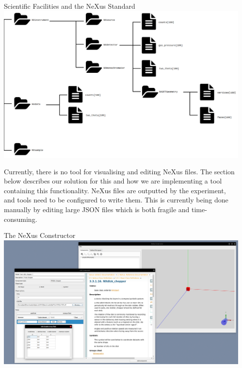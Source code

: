 \documentclass[usenames,dvipsnames]{beamer}
\begin{document}
\begin{frame}[t]
\begin{columns}[t]
\begin{column}{0.47\paperwidth}
\begin{custombox}{Scientific Facilities and the NeXus Standard}
\includegraphics[width=\linewidth]{nexusdiagram.png}

Currently, there is no tool for visualising and editing NeXus files. The section below describes our solution for this and how we are implementing a tool containing this functionality. NeXus files are outputted by the experiment, and tools need to be configured to write them. This is currently being done manually by editing large JSON files which is both fragile and time-consuming.
\end{custombox}

\begin{custombox}{The NeXus Constructor}
\includegraphics[width=\linewidth]{screenshot.png}
\end{custombox}

\end{column}   

\begin{column}{0.47\paperwidth}  


\end{column}
\end{columns}
\end{frame}
\end{document}
